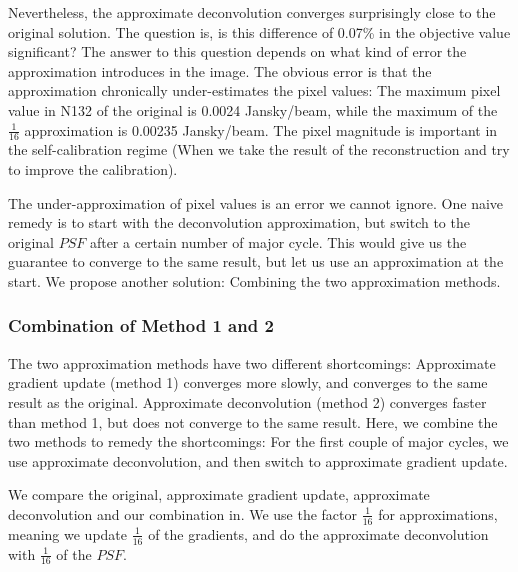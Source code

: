 Nevertheless, the approximate deconvolution converges surprisingly close to the original solution. The question is, is this difference of 0.07\% in the objective value significant? The answer to this question depends on what kind of error the approximation introduces in the image. The obvious error is that the approximation chronically under-estimates the pixel values: The maximum pixel value in N132 of the original is 0.0024 Jansky/beam, while the maximum of the $\frac{1}{16}$ approximation is 0.00235 Jansky/beam. The pixel magnitude is important in the self-calibration regime \cite{offringa2017optimized} (When we take the result of the reconstruction and try to improve the calibration).

The under-approximation of pixel values is an error we cannot ignore. One naive remedy is to start with the deconvolution approximation, but switch to the original $PSF$ after a certain number of major cycle. This would give us the guarantee to converge to the same result, but let us use an approximation at the start. We propose another solution: Combining the two approximation methods.


\subsubsection{Combination of Method 1 and 2}\label{results:gradients:comparison}
The two approximation methods have two different shortcomings: Approximate gradient update (method 1) converges more slowly, and converges to the same result as the original. Approximate deconvolution (method 2) converges faster than method 1, but does not converge to the same result. Here, we combine the two methods to remedy the shortcomings: For the first couple of major cycles, we use approximate deconvolution, and then switch to approximate gradient update.

We compare the original, approximate gradient update, approximate deconvolution and our combination in. We use the factor $\frac{1}{16}$ for approximations, meaning we update $\frac{1}{16}$ of the gradients, and do the approximate deconvolution with $\frac{1}{16}$ of the $PSF$.

